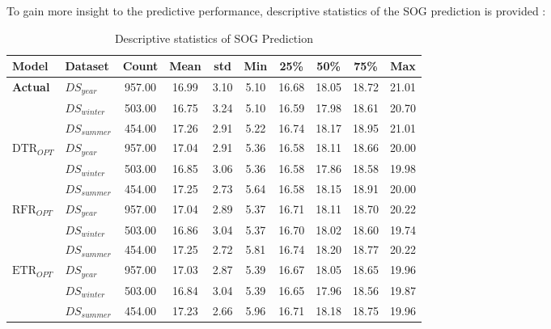 To gain more insight to the predictive performance, descriptive statistics of the SOG prediction is provided :\\

\begin{table}[h]
    \footnotesize
    \centering
    {\begin{tabular}{ l l c c c c c c c c }
    \hline
    Model & Dataset & Count & Mean & std & Min & 25\% & 50\% & 75\% & Max \\
    \hline
    \textbf{{Actual}} & $DS_{year}$ & 957.00 &  16.99 &   3.10 & 5.10 &  16.68 &  18.05 &  18.72 &  21.01 \\
    & $DS_{winter}$ & 503.00 &  16.75 &   3.24 & 5.10 &  16.59 &  17.98 &  18.61 &  20.70 \\
    & $DS_{summer}$ & 454.00 &  17.26 &   2.91 & 5.22 &  16.74 &  18.17 &  18.95 &  21.01 \\
    \hline
    $\text{DTR}_{OPT}$ & $DS_{year}$ & 957.00 &  17.04 &   2.91 & 5.36 &  16.58 &  18.11 &  18.66 &  20.00 \\
    & $DS_{winter}$ & 503.00 &  16.85 &   3.06 & 5.36 &  16.58 &  17.86 &  18.58 &  19.98 \\
    & $DS_{summer}$ & 454.00 &  17.25 &   2.73 & 5.64 &  16.58 &  18.15 &  18.91 &  20.00 \\
    \hline
    $\text{RFR}_{OPT}$ & $DS_{year}$ & 957.00 &  17.04 &   2.89 & 5.37 &  16.71 &  18.11 &  18.70 &  20.22 \\
    & $DS_{winter}$ & 503.00 &  16.86 &   3.04 & 5.37 &  16.70 &  18.02 &  18.60 &  19.74 \\
    & $DS_{summer}$ & 454.00 &  17.25 &   2.72 & 5.81 &  16.74 &  18.20 &  18.77 &  20.22 \\
    \hline
    $\text{ETR}_{OPT}$ & $DS_{year}$ & 957.00 &  17.03 &   2.87 & 5.39 &  16.67 &  18.05 &  18.65 &  19.96 \\
    & $DS_{winter}$ & 503.00 &  16.84 &   3.04 & 5.39 &  16.65 &  17.96 &  18.56 &  19.87 \\
    & $DS_{summer}$ & 454.00 &  17.23 &   2.66 & 5.96 &  16.71 &  18.18 &  18.75 &  19.96 \\
    \hline
    \end{tabular}}
\caption{Descriptive statistics of SOG Prediction}\label{tbl:SOG_pred_descriptive}
\end{table}


